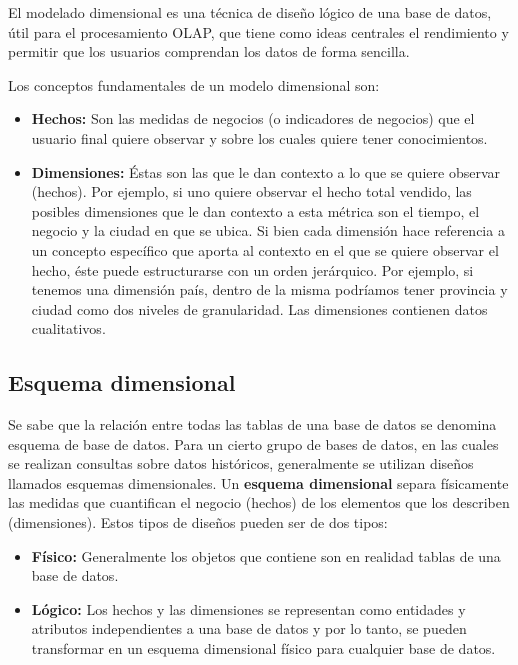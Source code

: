 \documentclass[a4paper,11pt]{article}
\begin{document}
    El modelado dimensional es una técnica de diseño lógico de una base de datos, útil para el procesamiento OLAP, que tiene como ideas centrales el
    rendimiento y permitir que los usuarios comprendan los datos de forma sencilla.\par 
    
    Los conceptos fundamentales de un modelo dimensional son:
    
    \begin{itemize}
      \item \textbf{Hechos:} Son las medidas de negocios (o indicadores de negocios) que el usuario final quiere observar y sobre los cuales quiere tener
      conocimientos.
      \item \textbf{Dimensiones:} Éstas son las que le dan contexto a lo que se quiere observar (hechos). Por ejemplo, si uno quiere observar el hecho total 
      vendido, las posibles dimensiones que le dan contexto a esta métrica son el tiempo, el negocio y la ciudad en que se ubica. Si bien cada dimensión hace
      referencia a un concepto específico que aporta al contexto en el que se quiere observar el hecho, éste puede estructurarse con un orden jerárquico.
      Por ejemplo, si tenemos una dimensión país, dentro de la misma podríamos tener provincia y ciudad como dos niveles de granularidad. Las dimensiones 
      contienen datos cualitativos.
    \end{itemize}
    
    
    \subsection{Esquema dimensional}
    
    Se sabe que la relación entre todas las tablas de una base de datos se denomina esquema de base de datos. Para un cierto grupo de bases de datos, en las
    cuales se realizan consultas sobre datos históricos, generalmente se utilizan diseños llamados esquemas dimensionales. Un \textbf{esquema dimensional}
    separa físicamente las medidas que cuantifican el negocio (hechos) de los elementos que los describen (dimensiones). Estos tipos de diseños pueden ser de
    dos tipos:\par
    
    \begin{itemize}
      \item \textbf{Físico:} Generalmente los objetos que contiene son en realidad tablas de una base de datos.
      \item \textbf{Lógico:} Los hechos y las dimensiones se representan como entidades y atributos independientes a una base de datos y por lo tanto,
      se pueden transformar en un esquema dimensional físico para cualquier base de datos.
    \end{itemize}
    
\end{document}
